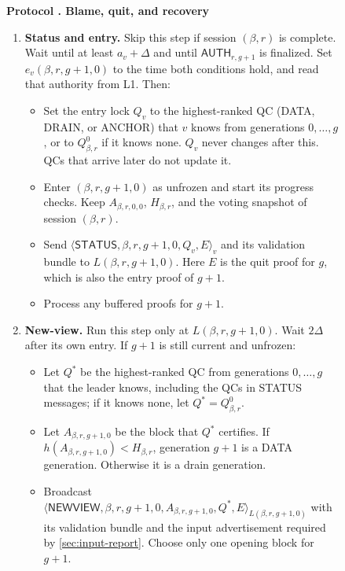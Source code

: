 \documentclass[11pt,a4paper]{article}
\newcommand{\RR}[1]{{\color{rrRed}#1}}
\newcommand{\tagg}[1]{\ensuremath{\mathsf{#1}}}
\newcounter{protocol}
\newenvironment{protocol}[3][htbp]{\begin{figure}[#1]\refstepcounter{protocol}\label{#2}
\begin{mdframed}[linewidth=.6pt,skipabove=0pt,skipbelow=0pt,
innertopmargin=7pt,innerbottommargin=7pt]\small
\textbf{Protocol \theprotocol. #3}\par\smallskip}{\end{mdframed}\end{figure}}
\begin{document}
\begin{protocol}{alg:recovery}{Blame, quit, and recovery}
\begin{enumerate}[label=\textbf{\arabic*)},itemsep=3pt]
\item \textbf{Status and entry.} \RR{Skip this step if session $(\beta,r)$ is
complete.} \RR{Wait until at least $a_v+\Delta$ and until
$\tagg{AUTH}_{r,g+1}$ is finalized. Set $e_v(\beta,r,g+1,0)$ to the time both
conditions hold, and read that authority from L1.} Then:
 \begin{itemize}
 \item Set the entry lock $Q_v$ to the highest-ranked QC
       (DATA\RR{, DRAIN,} or ANCHOR) that $v$ knows from generations
       $0,\ldots,g$\RR{, or to $Q_{\beta,r}^0$ if it knows none}.
       $Q_v$ never changes after this. QCs that arrive later do not
       update it.
 \item Enter $(\beta,r,g+1,0)$ as unfrozen and start its progress checks.
       \RR{Keep $A_{\beta,r,0,0}$, $H_{\beta,r}$, and the voting snapshot of session $(\beta,r)$.}
 \item Send $\langle\tagg{STATUS},\beta,r,g+1,0,Q_v,E\rangle_v$ and its
       validation bundle to $L(\beta,r,g+1,0)$. Here $E$ is the quit proof for
       $g$, which is also the entry proof of $g+1$.
 \item Process any buffered proofs for $g+1$.
 \end{itemize}

\item \textbf{New-view.} Run this step only at $L(\beta,r,g+1,0)$. Wait $2\Delta$
after its own entry. If $g+1$ is still current and unfrozen:
 \begin{itemize}
 \item Let $Q^*$ be the highest-ranked QC from generations $0,\ldots,g$
       that the leader knows, including the QCs in STATUS
       messages\RR{; if it knows none, let $Q^*=Q_{\beta,r}^0$}.
 \item Let $A_{\beta,r,g+1,0}$ be the block that $Q^*$ certifies. \RR{If
       $h(A_{\beta,r,g+1,0})<H_{\beta,r}$, generation $g+1$ is a DATA generation.
       Otherwise it is a drain generation.}
 \item Broadcast
       $\langle\tagg{NEWVIEW},\beta,r,g+1,0,A_{\beta,r,g+1,0},Q^*,E\rangle_{L(\beta,r,g+1,0)}$
       with its validation bundle and the input advertisement required
       by \cref{sec:input-report}. Choose only one opening block for
       $g+1$.
 \end{itemize}


\end{enumerate}
\end{protocol}
\end{document}

